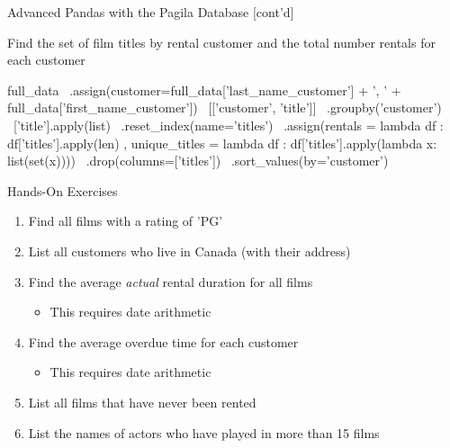 \documentclass[ignorenonframetext,xcolor=x11names]{beamer}
\begin{document}
\begin{frame}[fragile]{Advanced Pandas with the Pagila Database \small [cont'd]}

Find the set of film titles by rental customer and the total number rentals for each customer

\scriptsize
\begin{pythoncode}
full_data \
   .assign(customer=full_data['last_name_customer'] + ', ' + 
                    full_data['first_name_customer']) \
   [['customer', 'title']] \
   .groupby('customer') \
   ['title'].apply(list) \
   .reset_index(name='titles') \
   .assign(rentals = lambda df :
              df['titles'].apply(len) ,
           unique_titles = lambda df :
              df['titles'].apply(lambda x: list(set(x)))) \
   .drop(columns=['titles']) \
   .sort_values(by='customer')

\end{pythoncode}
\end{frame}

\begin{frame}{Hands-On Exercises}
\begin{enumerate}
  \item Find all films with a rating of 'PG'
  \item List all customers who live in Canada (with their address)
  \item Find the average \emph{actual} rental duration for all films
  \begin{itemize}
     \item This requires date arithmetic
  \end{itemize}
  \item Find the average overdue time for each customer
  \begin{itemize}
     \item This requires date arithmetic
  \end{itemize}
  \item List all films that have never been rented
  \item List the names of actors who have played in more than 15 films
\end{enumerate}
\end{frame}
\end{document}
